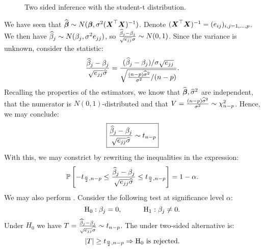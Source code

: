 \begin{figure}[H]
    \centering
    \caption{Two sided inference with the student-t distribution.}
\end{figure}

We have seen that $\widehat{\boldsymbol{\beta}}\sim N(\boldsymbol{\beta}, \sigma^2(\boldsymbol{X}^\top\boldsymbol{X})^{-1})$. Denote $(\boldsymbol{X}^\top\boldsymbol{X})^{-1}=(e_{ij})_{i,j=1,\dots,p}$. We then have $\widehat{\beta}_j\sim N(\beta_j, \sigma^2 e_{jj})$, so $\frac{\widehat{\beta}_j-\beta_j}{\sqrt{e_{jj}}\sigma}\sim N(0,1)$. Since the variance is unknown, consider the statistic:
$$
    \frac{\widehat{\beta}_j-\beta_j}{\sqrt{e_{jj}}\widehat{\sigma}}
    =
    \frac{(\widehat{\beta}_j-\beta_j)/\sigma\sqrt{e_{jj}}}{\sqrt{\frac{(n-p)\widehat{\sigma}^2}{\sigma^2} / (n-p)}}.
$$
Recalling the properties of the estimators, we know that $\widehat{\boldsymbol{\beta}}, \widehat{\sigma}^2$ are independent, that the numerator is $N(0,1)$-distributed and that $V=\frac{(n-p)\widehat{\sigma}^2}{\sigma^2}\sim \chi^2_{n-p}$. Hence, we may conclude:
\begin{equation}
    \boxed{\frac{\widehat{\beta}_j-\beta_j}{\sqrt{e_{jj}}\widehat{\sigma}} \sim t_{n-p}}
\end{equation}
With this, we may constrict  by rewriting the inequalities in the expression:
$$
    \mathbb{P}\left[-t_{\frac{\alpha}{2},n-p} \leq \frac{\widehat{\beta}_j-\beta_j}{\sqrt{e_{jj}}\widehat{\sigma}} \leq t_{\frac{\alpha}{2}, n-p}\right] = 1-\alpha.
$$
We may also perform . Consider the following test at significance level $\alpha$:
$$
    \mathrm{H}_0 : \beta_j = 0, 
    \quad\quad\quad
    \mathrm{H}_1 : \beta_j \ne 0.
$$
Under $H_0$ we have $T=\frac{\widehat{\beta}_j-\beta_j}{\sqrt{e_{jj}}\widehat{\sigma}} \sim t_{n-p}$. The  under two-sided alternative is:
$$
    \lvert T \rvert \geq t_{\frac{\alpha}{2}, n-p} \Rightarrow \mathrm{H}_0 \textrm{ is rejected}.
$$

